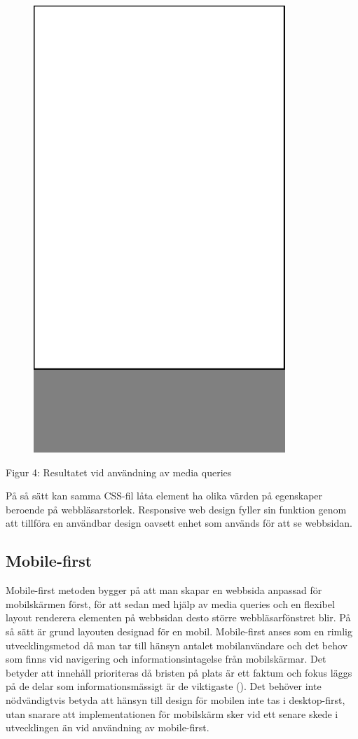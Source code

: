 \documentclass[11pt]{article}
\begin{document}
\vspace{1cm}
\begin{figure}[h]
\centerline{%
\includegraphics[scale=0.25]{pics/mobilesmall.png}
}
\end{figure}
\centerline{Figur 4: Resultatet vid användning av media queries}
\vspace{0.5cm}

På så sätt kan samma CSS-fil låta element ha olika värden på egenskaper beroende på webbläsarstorlek. Responsive web design fyller sin funktion genom att tillföra en användbar design oavsett enhet som används för att se webbsidan. 
\newpage

\subsection{Mobile-first}
Mobile-first metoden bygger på att man skapar en webbsida anpassad för mobilskärmen först, för att sedan med hjälp av media queries och en flexibel layout renderera elementen på webbsidan desto större webbläsarfönstret blir.  På så sätt är grund layouten designad för en mobil. Mobile-first anses som en rimlig utvecklingsmetod då man tar till hänsyn antalet mobilanvändare och det behov som finns vid navigering och informationsintagelse från mobilskärmar.  Det betyder att innehåll prioriteras då bristen på plats är ett faktum och fokus läggs på de delar som informationsmässigt är de viktigaste (\cite{Mobilefirst}). Det behöver inte nödvändigtvis betyda att hänsyn till design för mobilen inte tas i desktop-first, utan snarare att implementationen för mobilskärm sker vid ett senare skede i utvecklingen än vid användning av mobile-first.
\end{document}
